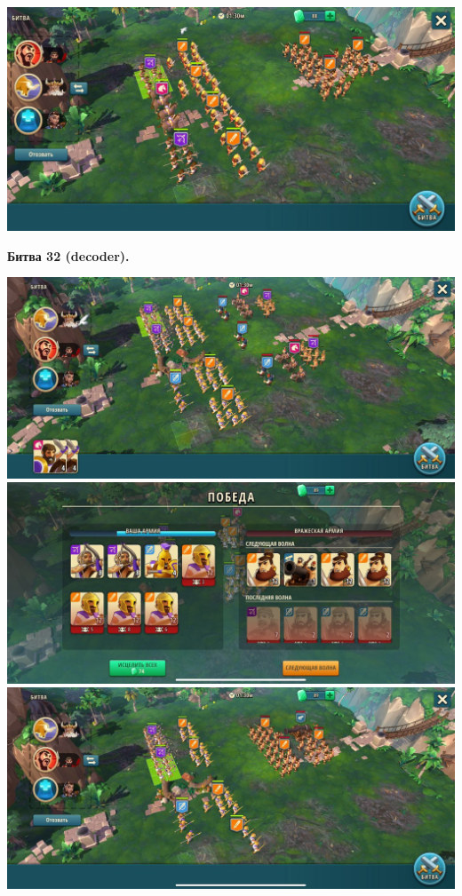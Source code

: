 \noindent\includegraphics[width=\linewidth]{./parts/media/TreasureHunt/31/sargon/photo_2022-04-07_10-05-22.jpg} \newline

\newpage
\begin{center}
	\hypertarget{fight32}{\textbf{Битва 32 (decoder).}}
\end{center}
\noindent\includegraphics[width=\linewidth]{./parts/media/TreasureHunt/32/decoder/photo_2022-04-07_10-00-59.jpg} \newline
\noindent\includegraphics[width=\linewidth]{./parts/media/TreasureHunt/32/decoder/photo_2022-04-07_10-01-48.jpg} \newline
\noindent\includegraphics[width=\linewidth]{./parts/media/TreasureHunt/32/decoder/photo_2022-04-07_10-01-54.jpg} \newline
